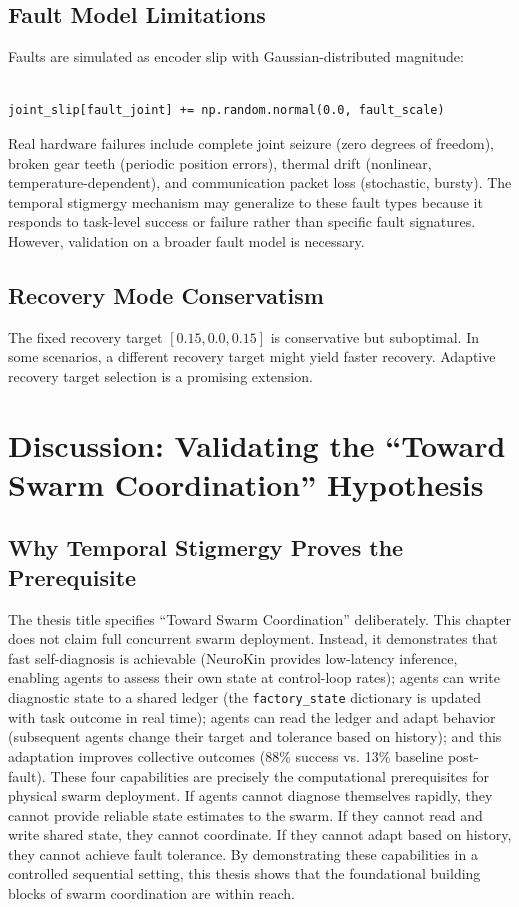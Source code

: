 \documentclass[12pt,a4paper,oneside]{report}
\begin{document}
\subsection{Fault Model Limitations}
\label{subsec:fault_model_limitations}

Faults are simulated as encoder slip with Gaussian-distributed magnitude:
\begin{verbatim}

joint_slip[fault_joint] += np.random.normal(0.0, fault_scale)
\end{verbatim}

Real hardware failures include complete joint seizure (zero degrees of freedom), broken gear teeth (periodic position errors), thermal drift (nonlinear, temperature-dependent), and communication packet loss (stochastic, bursty). The temporal stigmergy mechanism may generalize to these fault types because it responds to task-level success or failure rather than specific fault signatures. However, validation on a broader fault model is necessary.
\subsection{Recovery Mode Conservatism}
\label{subsec:recovery_mode_conservatism}

The fixed recovery target $[0.15, 0.0, 0.15]$ is conservative but suboptimal. In some scenarios, a different recovery target might yield faster recovery. Adaptive recovery target selection is a promising extension.
\section{Discussion: Validating the ``Toward Swarm Coordination'' Hypothesis}
\subsection{Why Temporal Stigmergy Proves the Prerequisite}
\label{subsec:why_temporal_stigmergy_proves_the_prerequisite}

The thesis title specifies ``Toward Swarm Coordination'' deliberately. This chapter does not claim full concurrent swarm deployment. Instead, it demonstrates that fast self-diagnosis is achievable (NeuroKin provides low-latency inference, enabling agents to assess their own state at control-loop rates); agents can write diagnostic state to a shared ledger (the \texttt{factory\_state} dictionary is updated with task outcome in real time); agents can read the ledger and adapt behavior (subsequent agents change their target and tolerance based on history); and this adaptation improves collective outcomes (88\% success vs. 13\% baseline post-fault). These four capabilities are precisely the computational prerequisites for physical swarm deployment. If agents cannot diagnose themselves rapidly, they cannot provide reliable state estimates to the swarm. If they cannot read and write shared state, they cannot coordinate. If they cannot adapt based on history, they cannot achieve fault tolerance. By demonstrating these capabilities in a controlled sequential setting, this thesis shows that the foundational building blocks of swarm coordination are within reach.
\end{document}
